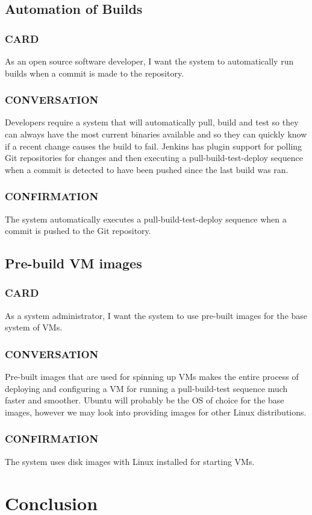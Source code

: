 \documentclass[10pt,letterpaper,onecolumn,journal]{IEEEtran}
\begin{document}
\subsection{Automation of Builds}
\subsubsection{CARD}
As an open source software developer, I want the system to automatically run builds when a commit is made to the repository.
\subsubsection{CONVERSATION}
Developers require a system that will automatically pull, build and test so they can always have the most current
binaries available and so they can quickly know if a recent change causes the build to fail. Jenkins has plugin support for polling
Git repositories for changes and then executing a pull-build-test-deploy sequence when a commit is detected to have been pushed since
the last build was ran.
\subsubsection{CONFIRMATION}
The system automatically executes a pull-build-test-deploy sequence when a commit is pushed to the Git repository.

\subsection{Pre-build VM images}
\subsubsection{CARD}
As a system administrator, I want the system to use pre-built images for the base system of VMs.
\subsubsection{CONVERSATION}
Pre-built images that are used for spinning up VMs makes the entire process of deploying and configuring a VM
for running a pull-build-test sequence much faster and smoother. Ubuntu will probably be the OS of choice for the base images, however
we may look into providing images for other Linux distributions.
\subsubsection{CONFIRMATION}
The system uses disk images with Linux installed for starting VMs.
\section{Conclusion}
\clearpage
\end{document}
